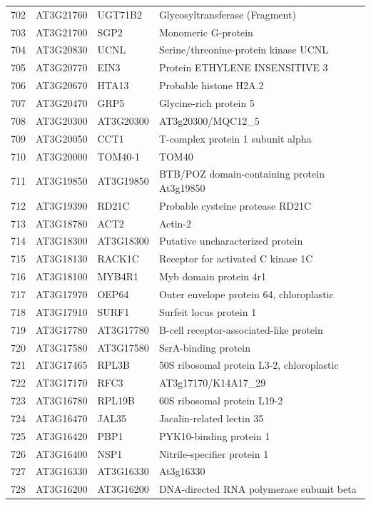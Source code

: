 \documentclass[11pt]{article}
\begin{document}
\begin{center}
\begin{tabular}{rlll}
702 & AT3G21760 & UGT71B2 & Glycosyltransferase (Fragment)\\
703 & AT3G21700 & SGP2 & Monomeric G-protein\\
704 & AT3G20830 & UCNL & Serine/threonine-protein kinase UCNL\\
705 & AT3G20770 & EIN3 & Protein ETHYLENE INSENSITIVE 3\\
706 & AT3G20670 & HTA13 & Probable histone H2A.2\\
707 & AT3G20470 & GRP5 & Glycine-rich protein 5\\
708 & AT3G20300 & AT3G20300 & AT3g20300/MQC12\_5\\
709 & AT3G20050 & CCT1 & T-complex protein 1 subunit alpha\\
710 & AT3G20000 & TOM40-1 & TOM40\\
711 & AT3G19850 & AT3G19850 & BTB/POZ domain-containing protein At3g19850\\
712 & AT3G19390 & RD21C & Probable cysteine protease RD21C\\
713 & AT3G18780 & ACT2 & Actin-2\\
714 & AT3G18300 & AT3G18300 & Putative uncharacterized protein\\
715 & AT3G18130 & RACK1C & Receptor for activated C kinase 1C\\
716 & AT3G18100 & MYB4R1 & Myb domain protein 4r1\\
717 & AT3G17970 & OEP64 & Outer envelope protein 64, chloroplastic\\
718 & AT3G17910 & SURF1 & Surfeit locus protein 1\\
719 & AT3G17780 & AT3G17780 & B-cell receptor-associated-like protein\\
720 & AT3G17580 & AT3G17580 & SsrA-binding protein\\
721 & AT3G17465 & RPL3B & 50S ribosomal protein L3-2, chloroplastic\\
722 & AT3G17170 & RFC3 & AT3g17170/K14A17\_29\\
723 & AT3G16780 & RPL19B & 60S ribosomal protein L19-2\\
724 & AT3G16470 & JAL35 & Jacalin-related lectin 35\\
725 & AT3G16420 & PBP1 & PYK10-binding protein 1\\
726 & AT3G16400 & NSP1 & Nitrile-specifier protein 1\\
727 & AT3G16330 & AT3G16330 & At3g16330\\
728 & AT3G16200 & AT3G16200 & DNA-directed RNA polymerase subunit beta\\

\end{tabular}
\end{center}
\end{document}
